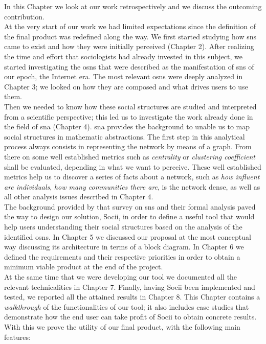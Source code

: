 In this Chapter we look at our work retrospectively and we discuss the outcoming contribution.\\
\indent At the very start of our work we had limited expectations since the definition of the final product was redefined along the way. We first started studying how \glspl{sn} came to exist and how they were initially perceived (Chapter 2). After realizing the time and effort that sociologists had already invested in this subject, we started investigating the \glspl{osn} that were described as the manifestation of \glspl{sn} of our epoch, the Internet era. The most relevant \glspl{osn} were deeply analyzed in Chapter 3; we looked on how they are composed and what drives users to use them.\\
\indent Then we needed to know how these social structures are studied and interpreted from a scientific perspective; this led us to investigate the work already done in the field of \gls{sna} (Chapter 4). \gls{sna} provides the background to unable us to map social structures in mathematic abstractions. The first step in this analytical process always consists in representing the network by means of a graph. From there on some well established metrics such as \emph{centrality} or \emph{clustering coefficient} shall be evaluated, depending in what we want to perceive. These well established metrics help us to discover a series of facts about a network, such as \emph{how influent are individuals}, \emph{how many communities there are}, is the network dense, as well as all other analysis issues described in Chapter 4.\\
\indent The background provided by that survey on \glspl{sn} and their formal analysis paved the way to design our solution, Socii, in order to define a useful tool that would help users understanding their social structures based on the analysis of the identified \glspl{osn}. In Chapter 5 we discussed our proposal at the most conceptual way discussing its architecture in terms of a block diagram. In Chapter 6 we defined the requirements and their respective priorities in order to obtain a minimum viable product at the end of the project.\\
\indent At the same time that we were developing our tool we documented all the relevant technicalities in Chapter 7. Finally, having Socii been implemented and tested, we reported all the attained results in Chapter 8. This Chapter contains a \textit{walkthrough} of the functionalities of our tool; it also includes case studies that demonstrate how the end user can take profit of Socii to obtain concrete results. With this we prove the utility of our final product, with the following main features:
